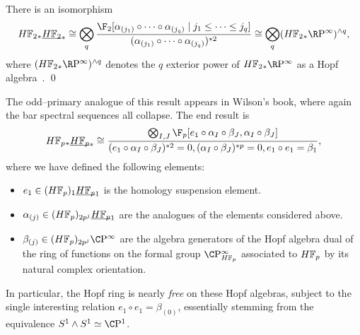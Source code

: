 \begin{corollary}\label{CalculationOfUnstableSteenrodHopfRing}
There is an isomorphism
\[\HFtwo_* \OS{\HFtwo}{*} \cong \bigotimes_q \frac{\F_2[\alpha_{(j_1)} \circ \cdots \circ \alpha_{(j_q)} \mid j_1 \le \cdots \le j_q]}{(\alpha_{(j_1)} \circ \cdots \circ \alpha_{(j_q)})^{\ast 2}} \cong \bigotimes_q (\HFtwo_* \RP^\infty)^{\sm q},\] where \((\HFtwo_* \RP^\infty)^{\sm q}\) denotes the \(q\){\th} exterior power of \(\HFtwo_* \RP^\infty\) as a Hopf algebra~\cite[Propposition 5.5]{GoerssDieudonne}. \qed
\end{corollary}

\begin{remark}
The odd--primary analogue of this result appears in Wilson's book, where again the bar spectral sequences all collapse.  The end result is \[\HFp_* \OS{\HFp}{*} \cong \frac{\bigotimes_{I, J} \F_p[e_1 \circ \alpha_I \circ \beta_J, \alpha_I \circ \beta_J]}{(e_1 \circ \alpha_I \circ \beta_J)^{\ast 2} = 0, (\alpha_I \circ \beta_J)^{\ast p} = 0, e_1 \circ e_1 = \beta_1},\] where we have defined the following elements:
\begin{itemize}
\item \(e_1 \in (\HFp)_1 \OS{\HFp}{1}\) is the homology suspension element.
\item \(\alpha_{(j)} \in (\HFp)_{2p^j} \OS{\HFp}{1}\) are the analogues of the elements considered above.
\item \(\beta_{(j)} \in (\HFp)_{2p^j} \CP^\infty\) are the algebra generators of the Hopf algebra dual of the ring of functions on the formal group \(\CP^\infty_{\HFp}\) associated to \(\HFp\) by its natural complex orientation.
\end{itemize}
In particular, the Hopf ring is nearly \emph{free} on these Hopf algebras, subject to the single interesting relation \(e_1 \circ e_1 = \beta_{(0)}\), essentially stemming from the equivalence \(S^1 \sm S^1 \simeq \CP^1\).
\end{remark}

